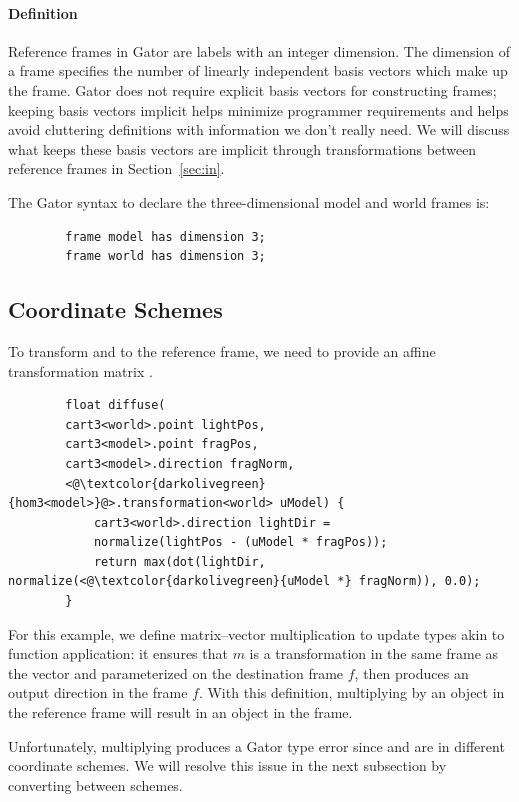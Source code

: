 \documentclass[../main.tex]{subfiles}
\begin{document}
	\paragraph{Definition}
	Reference frames in Gator are labels with an integer dimension.  The dimension of a frame specifies the number of linearly independent basis vectors which make up the frame. Gator does not require explicit basis vectors for constructing frames; keeping basis vectors implicit helps minimize programmer requirements and helps avoid cluttering definitions with information we don't really need.
	We will discuss what keeps these basis vectors are implicit through transformations between reference frames in Section~\ref{sec:in}.
	
	The Gator syntax to declare the three-dimensional model and world frames is:
	\begin{lstlisting}
		frame model has dimension 3;
		frame world has dimension 3;
	\end{lstlisting}
	\subsection{Coordinate Schemes}
	\label{subsec:schemes}
	
	To transform  and  to the  reference frame, we need to provide an affine transformation matrix .
	\begin{lstlisting}
		float diffuse(
		cart3<world>.point lightPos, 
		cart3<model>.point fragPos, 
		cart3<model>.direction fragNorm,
		<@\textcolor{darkolivegreen}{hom3<model>}@>.transformation<world> uModel) {
			cart3<world>.direction lightDir = 
			normalize(lightPos - (uModel * fragPos));
			return max(dot(lightDir, normalize(<@\textcolor{darkolivegreen}{uModel *} fragNorm)), 0.0);
		}
	\end{lstlisting}
	For this example, we define matrix--vector multiplication  to update types akin to function application: it ensures that $m$ is a transformation in the same frame as the vector and parameterized on the destination frame $f$, then produces an output direction in the frame $f$.
	With this definition, multiplying  by an object in the  reference frame will result in an object in the  frame.
	
	Unfortunately, multiplying  produces a Gator type error since  and  are in different coordinate schemes.
	We will resolve this issue in the next subsection by converting between schemes.
	
\end{document}
